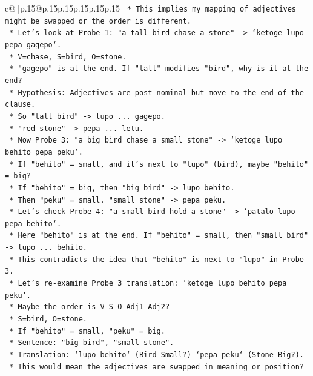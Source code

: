 \documentclass{article}
\begin{document}
{\begin{supertabular}{c@{$\;$}|p{.15\linewidth}@{}p{.15\linewidth}p{.15\linewidth}p{.15\linewidth}p{.15\linewidth}p{.15\linewidth}}
{{{\texttt{        *   This implies my mapping of adjectives might be swapped or the order is different.} \\
\texttt{        *   Let's look at Probe 1: "a tall bird chase a stone" {-}> `ketoge lupo pepa gagepo`.} \\
\texttt{            *   V=chase, S=bird, O=stone.} \\
\texttt{            *   "gagepo" is at the end. If "tall" modifies "bird", why is it at the end?} \\
\texttt{            *   Hypothesis: Adjectives are post{-}nominal but move to the end of the clause.} \\
\texttt{            *   So "tall bird" {-}> lupo ... gagepo.} \\
\texttt{            *   "red stone" {-}> pepa ... letu.} \\
\texttt{        *   Now Probe 3: "a big bird chase a small stone" {-}> `ketoge lupo behito pepa peku`.} \\
\texttt{            *   If "behito" = small, and it's next to "lupo" (bird), maybe "behito" = big?} \\
\texttt{            *   If "behito" = big, then "big bird" {-}> lupo behito.} \\
\texttt{            *   Then "peku" = small. "small stone" {-}> pepa peku.} \\
\texttt{            *   Let's check Probe 4: "a small bird hold a stone" {-}> `patalo lupo pepa behito`.} \\
\texttt{            *   Here "behito" is at the end. If "behito" = small, then "small bird" {-}> lupo ... behito.} \\
\texttt{            *   This contradicts the idea that "behito" is next to "lupo" in Probe 3.} \\
\texttt{            *   Let's re{-}examine Probe 3 translation: `ketoge lupo behito pepa peku`.} \\
\texttt{            *   Maybe the order is V S O Adj1 Adj2?} \\
\texttt{            *   S=bird, O=stone.} \\
\texttt{            *   If "behito" = small, "peku" = big.} \\
\texttt{            *   Sentence: "big bird", "small stone".} \\
\texttt{            *   Translation: `lupo behito` (Bird Small?) `pepa peku` (Stone Big?).} \\
\texttt{            *   This would mean the adjectives are swapped in meaning or position?} \\
}}}
\end{supertabular}}
\end{document}
